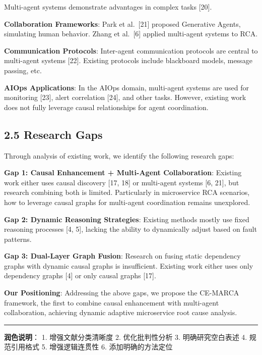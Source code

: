 Multi-agent systems demonstrate advantages in complex tasks {[}20{]}.

\textbf{Collaboration Frameworks}: Park et al.~{[}21{]} proposed
Generative Agents, simulating human behavior. Zhang et al.~{[}6{]}
applied multi-agent systems to RCA.

\textbf{Communication Protocols}: Inter-agent communication protocols
are central to multi-agent systems {[}22{]}. Existing protocols include
blackboard models, message passing, etc.

\textbf{AIOps Applications}: In the AIOps domain, multi-agent systems
are used for monitoring {[}23{]}, alert correlation {[}24{]}, and other
tasks. However, existing work does not fully leverage causal
relationships for agent coordination.

\hypertarget{research-gaps}{%
\subsection{2.5 Research Gaps}\label{research-gaps}}

Through analysis of existing work, we identify the following research
gaps:

\textbf{Gap 1: Causal Enhancement + Multi-Agent Collaboration}: Existing
work either uses causal discovery {[}17, 18{]} or multi-agent systems
{[}6, 21{]}, but research combining both is limited. Particularly in
microservice RCA scenarios, how to leverage causal graphs for
multi-agent coordination remains unexplored.

\textbf{Gap 2: Dynamic Reasoning Strategies}: Existing methods mostly
use fixed reasoning processes {[}4, 5{]}, lacking the ability to
dynamically adjust based on fault patterns.

\textbf{Gap 3: Dual-Layer Graph Fusion}: Research on fusing static
dependency graphs with dynamic causal graphs is insufficient. Existing
work either uses only dependency graphs {[}4{]} or only causal graphs
{[}17{]}.

\textbf{Our Positioning}: Addressing the above gaps, we propose the
CE-MARCA framework, the first to combine causal enhancement with
multi-agent collaboration, achieving dynamic adaptive microservice root
cause analysis.

\begin{center}\rule{0.5\linewidth}{0.5pt}\end{center}

\textbf{润色说明}： 1. 增强文献分类清晰度 2. 优化批判性分析 3.
明确研究空白表述 4. 规范引用格式 5. 增强逻辑连贯性 6. 添加明确的方法定位

